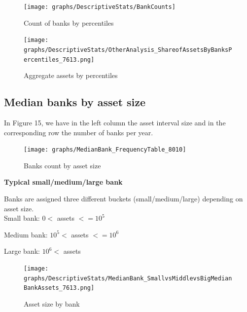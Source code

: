 \documentclass[12pt, a4paper]{article} %
\begin{document}
\begin{figure}[hbtp]
\centering
\caption{Count of banks by percentiles}
\texttt{[image: graphs/DescriptiveStats/BankCounts]}
\end{figure}


\begin{figure}[hbtp]
\centering
\caption{Aggregate assets by percentiles}
\texttt{[image: graphs/DescriptiveStats/OtherAnalysis\_ShareofAssetsByBanksPercentiles\_7613.png]}
\end{figure}

\subsection{Median banks by asset size}

In Figure 15, we have in the left column the asset interval size and in the corresponding row the number of banks per year.\\

\begin{figure}[hbtp]
\centering
\caption{Banks count by asset size}
\texttt{[image: graphs/MedianBank\_FrequencyTable\_8010]}
\end{figure}


\textbf{Typical small/medium/large bank}

Banks are assigned three different buckets (small/medium/large) depending on asset size.\\

Small bank: $0<$ assets $<= 10^5$

Medium bank: $10^5<$ assets $<= 10^6$

Large bank: $10^6<$ assets 

\begin{figure}[hbtp]
\centering
\caption{Asset size by bank}
\texttt{[image: graphs/DescriptiveStats/MedianBank\_SmallvsMiddlevsBigMedianBankAssets\_7613.png]}
\end{figure}
\end{document}
